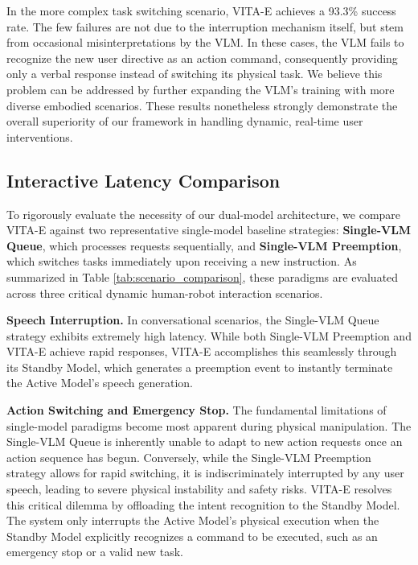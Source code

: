\begin{table}[!t]
    \caption{Success rates on interactive tasks (30 trials).}
    \label{tab:interactive-tasks}
    \centering
\end{table}

In the more complex task switching scenario, VITA-E achieves a 93.3\% success rate. The few failures are not due to the interruption mechanism itself, but stem from occasional misinterpretations by the VLM. In these cases, the VLM fails to recognize the new user directive as an action command, consequently providing only a verbal response instead of switching its physical task. We believe this problem can be addressed by further expanding the VLM's training with more diverse embodied scenarios. These results nonetheless strongly demonstrate the overall superiority of our framework in handling dynamic, real-time user interventions.

\subsection{Interactive Latency Comparison}

To rigorously evaluate the necessity of our dual-model architecture, we compare VITA-E against two representative single-model baseline strategies: \textbf{Single-VLM Queue}, which processes requests sequentially, and \textbf{Single-VLM Preemption}, which switches tasks immediately upon receiving a new instruction. As summarized in Table \ref{tab:scenario_comparison}, these paradigms are evaluated across three critical dynamic human-robot interaction scenarios.

\textbf{Speech Interruption.} In conversational scenarios, the Single-VLM Queue strategy exhibits extremely high latency. While both Single-VLM Preemption and VITA-E achieve rapid responses, VITA-E accomplishes this seamlessly through its Standby Model, which generates a preemption event to instantly terminate the Active Model's speech generation.

\textbf{Action Switching and Emergency Stop.} The fundamental limitations of single-model paradigms become most apparent during physical manipulation. The Single-VLM Queue is inherently unable to adapt to new action requests once an action sequence has begun. Conversely, while the Single-VLM Preemption strategy allows for rapid switching, it is indiscriminately interrupted by any user speech, leading to severe physical instability and safety risks. VITA-E resolves this critical dilemma by offloading the intent recognition to the Standby Model. The system only interrupts the Active Model's physical execution when the Standby Model explicitly recognizes a command to be executed, such as an emergency stop or a valid new task.

